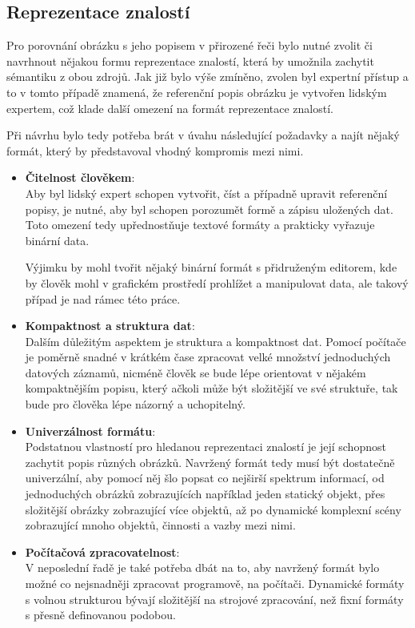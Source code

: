 \subsection{Reprezentace znalostí}
Pro porovnání obrázku s jeho popisem v přirozené řeči bylo nutné zvolit či navrhnout nějakou formu reprezentace znalostí,
která by umožnila zachytit sémantiku z obou zdrojů.
Jak již bylo výše zmíněno, zvolen byl expertní přístup a to v tomto případě znamená, že referenční popis obrázku je vytvořen lidským expertem,
což klade další omezení na formát reprezentace znalostí.

Při návrhu bylo tedy potřeba brát v úvahu následující požadavky a najít nějaký formát, který by představoval vhodný kompromis mezi nimi.
\begin{itemize}
	\item \textbf{Čitelnost člověkem}:\\
	      Aby byl lidský expert schopen vytvořit, číst a případně upravit referenční popisy,
	      je nutné, aby byl schopen porozumět formě a zápisu uložených dat.
	      Toto omezení tedy upřednostňuje textové formáty a prakticky vyřazuje binární data.

	      Výjimku by mohl tvořit nějaký binární formát s přidruženým editorem,
	      kde by člověk mohl v grafickém prostředí prohlížet a manipulovat data, ale takový případ je nad rámec této práce.
	\item \textbf{Kompaktnost a struktura dat}:\\
	      Dalším důležitým aspektem je struktura a kompaktnost dat.
	      Pomocí počítače je poměrně snadné v krátkém čase zpracovat velké množství jednoduchých datových záznamů,
	      nicméně člověk se bude lépe orientovat v nějakém kompaktnějším popisu, který ačkoli může být složitější ve své struktuře,
	      tak bude pro člověka lépe názorný a uchopitelný.
	\item \textbf{Univerzálnost formátu}:\\
	      Podstatnou vlastností pro hledanou reprezentaci znalostí je její schopnost zachytit popis různých obrázků.
	      Navržený formát tedy musí být dostatečně univerzální, aby pomocí něj šlo popsat co nejširší spektrum informací,
	      od jednoduchých obrázků zobrazujících například jeden statický objekt, přes složitější obrázky zobrazující více objektů,
	      až po dynamické komplexní scény zobrazující mnoho objektů, činnosti a vazby mezi nimi.
	\item \textbf{Počítačová zpracovatelnost}:\\
	      V neposlední řadě je také potřeba dbát na to, aby navržený formát bylo možné co nejsnadněji zpracovat programově, na počítači.
	      Dynamické formáty s volnou strukturou bývají složitější na strojové zpracování, než fixní formáty s přesně definovanou podobou.
\end{itemize}

